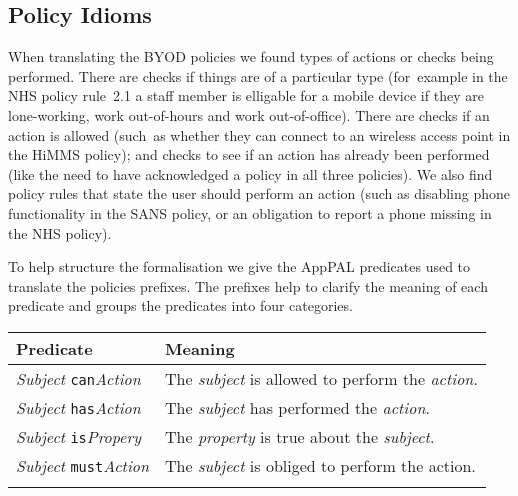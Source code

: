 \documentclass[a4paper]{article}
\begin{document}

\subsection{Policy Idioms}

When translating the \ac{BYOD} policies we found types of actions or checks being performed.
There are checks if things are of a particular type (for~example in the NHS policy rule~2.1  a staff member is elligable for a mobile device if they are lone-working, work out-of-hours and work out-of-office).  
There are checks if an action is allowed (such~as whether they can connect to an wireless access point in the \ac{HiMMS} policy);  and checks to see if an action has already been performed (like the need to have acknowledged a policy in all three policies).
We also find policy rules that state the user should perform an action (such as disabling phone functionality in the SANS policy, or an obligation to report a phone missing in the NHS policy).

To help structure the formalisation we give the AppPAL predicates used to translate the policies prefixes.
The prefixes help to clarify the meaning of each predicate and groups the predicates into four categories.

\begin{tabular}{l l}
  \toprule
  Predicate & Meaning \\
  \midrule
  \textit{Subject} \texttt{can}\textit{Action}  & The \emph{subject} is allowed to perform the \emph{action}. \\
  \textit{Subject} \texttt{has}\textit{Action}  & The \emph{subject} has performed the \emph{action}. \\
  \textit{Subject} \texttt{is}\textit{Propery}  & The \emph{property} is true about the \emph{subject}. \\
  \textit{Subject} \texttt{must}\textit{Action} & The \emph{subject} is obliged to perform the action. \\
  \bottomrule \\
\end{tabular}
\end{document}

